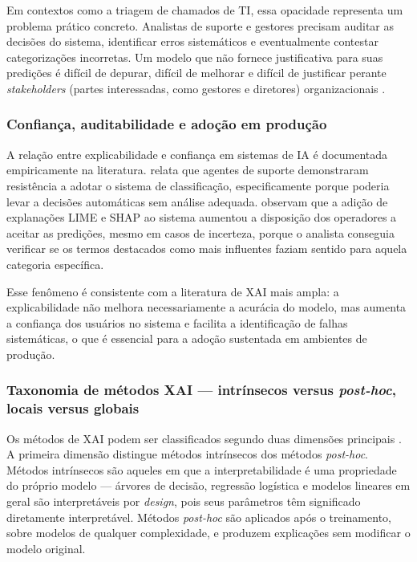 \documentclass[
    12pt,                %
    openright,           %
    oneside,             %
    a4paper,             %
    english,             %
    brazil               %
]{abntex2}
\begin{document}
Em contextos como a triagem de chamados de TI, essa opacidade representa um problema prático concreto. Analistas de suporte e gestores precisam auditar as decisões do sistema, identificar erros sistemáticos e eventualmente contestar categorizações incorretas. Um modelo que não fornece justificativa para suas predições é difícil de depurar, difícil de melhorar e difícil de justificar perante \textit{stakeholders} (partes interessadas, como gestores e diretores) organizacionais \cite{zemp2021}.

\subsubsection{Confiança, auditabilidade e adoção em produção}
\label{subsubsec:xai_confianca}

A relação entre explicabilidade e confiança em sistemas de IA é documentada empiricamente na literatura.  relata que agentes de suporte demonstraram resistência a adotar o sistema de classificação, especificamente porque poderia levar a decisões automáticas sem análise adequada.  observam que a adição de explanações LIME e SHAP ao sistema aumentou a disposição dos operadores a aceitar as predições, mesmo em casos de incerteza, porque o analista conseguia verificar se os termos destacados como mais influentes faziam sentido para aquela categoria específica.

Esse fenômeno é consistente com a literatura de XAI mais ampla: a explicabilidade não melhora necessariamente a acurácia do modelo, mas aumenta a confiança dos usuários no sistema e facilita a identificação de falhas sistemáticas, o que é essencial para a adoção sustentada em ambientes de produção.

\subsubsection{Taxonomia de métodos XAI — intrínsecos versus \textit{post-hoc}, locais versus globais}
\label{subsubsec:xai_taxonomia}

Os métodos de XAI podem ser classificados segundo duas dimensões principais \cite{salih2023}. A primeira dimensão distingue métodos intrínsecos dos métodos \textit{post-hoc}. Métodos intrínsecos são aqueles em que a interpretabilidade é uma propriedade do próprio modelo — árvores de decisão, regressão logística e modelos lineares em geral são interpretáveis por \textit{design}, pois seus parâmetros têm significado diretamente interpretável. Métodos \textit{post-hoc} são aplicados após o treinamento, sobre modelos de qualquer complexidade, e produzem explicações sem modificar o modelo original.
\end{document}
